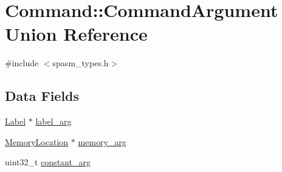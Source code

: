 \hypertarget{union_command_1_1_command_argument}{\section{\-Command\-:\-:\-Command\-Argument \-Union \-Reference}
\label{union_command_1_1_command_argument}
}


{\ttfamily \#include $<$spasm\-\_\-types.\-h$>$}

\subsection*{\-Data \-Fields}
\begin{DoxyCompactItemize}
\item 
\hyperlink{struct_label}{\-Label} $\ast$ \hyperlink{union_command_1_1_command_argument_ad35f7f6890ba7afda2f6df885c80ee1b}{label\-\_\-arg}
\item 
\hyperlink{struct_memory_location}{\-Memory\-Location} $\ast$ \hyperlink{union_command_1_1_command_argument_aa1d92797db179e44197eb21140e4d207}{memory\-\_\-arg}
\item 
uint32\-\_\-t \hyperlink{union_command_1_1_command_argument_abac24a4437e622f24b8667b66db36839}{constant\-\_\-arg}
\end{DoxyCompactItemize}


